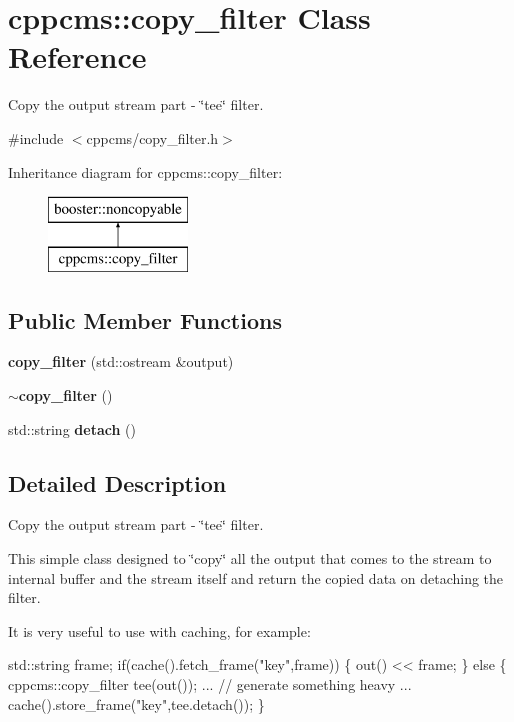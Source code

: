 \section{cppcms\-:\-:copy\-\_\-filter Class Reference}
\label{classcppcms_1_1copy__filter}


Copy the output stream part -\/ \char`\"{}tee\char`\"{} filter.  




{\ttfamily \#include $<$cppcms/copy\-\_\-filter.\-h$>$}

Inheritance diagram for cppcms\-:\-:copy\-\_\-filter\-:\begin{figure}[H]
\begin{center}
\leavevmode
\includegraphics[height=2.000000cm]{classcppcms_1_1copy__filter}
\end{center}
\end{figure}
\subsection*{Public Member Functions}
\begin{DoxyCompactItemize}
\item 
{\bf copy\-\_\-filter} (std\-::ostream \&output)
\item 
{\bf $\sim$copy\-\_\-filter} ()
\item 
std\-::string {\bf detach} ()
\end{DoxyCompactItemize}


\subsection{Detailed Description}
Copy the output stream part -\/ \char`\"{}tee\char`\"{} filter. 

This simple class designed to \char`\"{}copy\char`\"{} all the output that comes to the stream to internal buffer and the stream itself and return the copied data on detaching the filter.

It is very useful to use with caching, for example\-:


\begin{DoxyCode}
std::string frame;
\textcolor{keywordflow}{if}(cache().fetch\_frame(\textcolor{stringliteral}{"key"},frame)) \{
  out() << frame;
\}
\textcolor{keywordflow}{else} \{
  cppcms::copy_filter tee(out());
  ...
  \textcolor{comment}{// generate something heavy}
  ...
  cache().store\_frame(\textcolor{stringliteral}{"key"},tee.detach());
\}
\end{DoxyCode}
 

